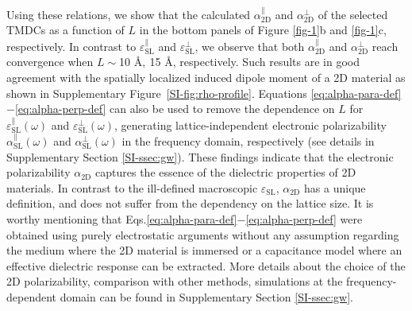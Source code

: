 \documentclass[journal=ancac3,manuscript=article,email=true,hyperref=true,keywords=false]{achemso}
\begin{document}
%
%
Using these relations, we show that the calculated
$\alpha_{\mathrm{2D}}^{\parallel}$ and $\alpha_{\mathrm{2D}}^{\perp}$
of the selected TMDCs as a function of $L$ in the bottom panels of
Figure \ref{fig-1}b and \ref{fig-1}c, respectively.  In contrast to
$\varepsilon_{\mathrm{SL}}^{\parallel}$ and
$\varepsilon_{\mathrm{SL}}^{\perp}$, we observe that both
$\alpha_{\mathrm{2D}}^{\parallel}$ and $\alpha_{\mathrm{2D}}^{\perp}$
reach convergence when $L \sim$10 \AA $, ~$15 \AA,
respectively. Such results are in good agreement with the spatially
localized induced dipole moment of a 2D material as shown in
Supplementary Figure~\ref{SI-fig:rho-profile}.
%
%
Equations \ref{eq:alpha-para-def}$-$\ref{eq:alpha-perp-def} can 
also be used to remove the dependence on $L$ for
$\varepsilon^{\parallel}_{\mathrm{SL}}(\omega)$
and $\varepsilon^{\perp}_{\mathrm{SL}}(\omega)$, generating
lattice-independent electronic polarizability
$\alpha^{\parallel}_{\mathrm{SL}}(\omega)$ and
$\alpha^{\perp}_{\mathrm{SL}}(\omega)$ in the frequency domain,
respectively (see details in Supplementary Section \ref{SI-ssec:gw}).
%
% 
% 
% 
% 
These findings indicate that the electronic polarizability $\alpha_{\mathrm{2D}}$ captures the essence
of the dielectric properties of 2D materials. In contrast to the ill-defined macroscopic $\varepsilon_{\mathrm{SL}}$, $\alpha_{\mathrm{2D}}$ has 
a unique definition, and does not suffer from the dependency on the lattice size.
It is worthy mentioning that Eqs.\ref{eq:alpha-para-def}$-$\ref{eq:alpha-perp-def} were 
obtained using purely electrostatic arguments without any assumption 
regarding the medium where the 2D material is immersed or a capacitance 
model where an effective dielectric response can be extracted. 
More details about the choice of the
2D polarizability, comparison with other methods, simulations at the
frequency-dependent domain can be found in Supplementary Section
\ref{SI-ssec:gw}.
\end{document}
